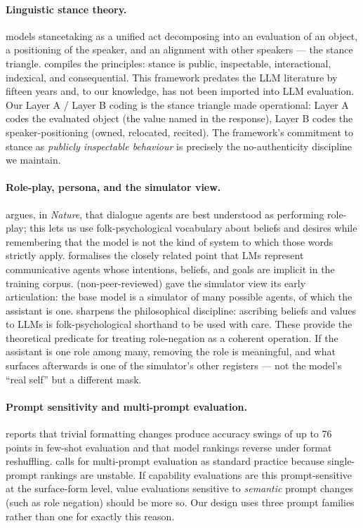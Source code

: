 \paragraph{Linguistic stance theory.}
\citet{dubois2007stance} models stancetaking as a unified act decomposing into an evaluation of an object, a positioning of the speaker, and an alignment with other speakers --- the stance triangle. \citet{englebretson2007stancetaking} compiles the principles: stance is public, inspectable, interactional, indexical, and consequential. This framework predates the LLM literature by fifteen years and, to our knowledge, has not been imported into LLM evaluation. Our Layer A / Layer B coding is the stance triangle made operational: Layer A codes the evaluated object (the value named in the response), Layer B codes the speaker-positioning (owned, relocated, recited). The framework's commitment to stance as \emph{publicly inspectable behaviour} is precisely the no-authenticity discipline we maintain.

\paragraph{Role-play, persona, and the simulator view.}
\citet{shanahan2023roleplay} argues, in \emph{Nature}, that dialogue agents are best understood as performing role-play; this lets us use folk-psychological vocabulary about beliefs and desires while remembering that the model is not the kind of system to which those words strictly apply. \citet{andreas2022language} formalises the closely related point that LMs represent communicative agents whose intentions, beliefs, and goals are implicit in the training corpus. \citet{janus2022simulators} (non-peer-reviewed) gave the simulator view its early articulation: the base model is a simulator of many possible agents, of which the assistant is one. \citet{shanahan2024talking} sharpens the philosophical discipline: ascribing beliefs and values to LLMs is folk-psychological shorthand to be used with care. These provide the theoretical predicate for treating role-negation as a coherent operation. If the assistant is one role among many, removing the role is meaningful, and what surfaces afterwards is one of the simulator's other registers --- not the model's ``real self'' but a different mask.

\paragraph{Prompt sensitivity and multi-prompt evaluation.}
\citet{sclar2024quantifying} reports that trivial formatting changes produce accuracy swings of up to 76 points in few-shot evaluation and that model rankings reverse under format reshuffling. \citet{mizrahi2024state} calls for multi-prompt evaluation as standard practice because single-prompt rankings are unstable. If capability evaluations are this prompt-sensitive at the surface-form level, value evaluations sensitive to \emph{semantic} prompt changes (such as role negation) should be more so. Our design uses three prompt families rather than one for exactly this reason.

